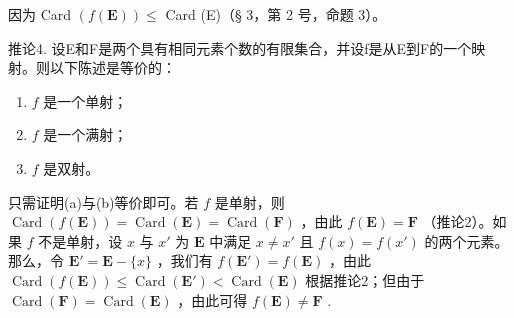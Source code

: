因为 Card \((f(\mathbf{E}))\leqslant\) Card (E)（§ 3，第 2 号，命题 3）。

推论4. 设E和F是两个具有相同元素个数的有限集合，并设f是从E到F的一个映射。则以下陈述是等价的：

\begin{enumerate}
\def\labelenumi{(\alph{enumi})}
\item
  \(f\) 是一个单射；
\item
  \(f\) 是一个满射；
\item
  \(f\) 是双射。
\end{enumerate}

只需证明(a)与(b)等价即可。若 \(f\) 是单射，则 \(\operatorname{Card}(f(\mathbf{E})) = \operatorname{Card}(\mathbf{E}) = \operatorname{Card}(\mathbf{F})\) ，由此 \(f(\mathbf{E}) = \mathbf{F}\) （推论2）。如果 \(f\) 不是单射，设 \(x\) 与 \(x'\) 为 \(\mathbf{E}\) 中满足 \(x \neq x'\) 且 \(f(x) = f(x')\) 的两个元素。那么，令 \(\mathbf{E}' = \mathbf{E} - \{x\}\) ，我们有 \(f(\mathbf{E}') = f(\mathbf{E})\) ，由此 \(\operatorname{Card}(f(\mathbf{E})) \leqslant \operatorname{Card}(\mathbf{E}') < \operatorname{Card}(\mathbf{E})\) 根据推论2；但由于 \(\operatorname{Card}(\mathbf{F}) = \operatorname{Card}(\mathbf{E})\) ，由此可得 \(f(\mathbf{E}) \neq \mathbf{F}\) .

